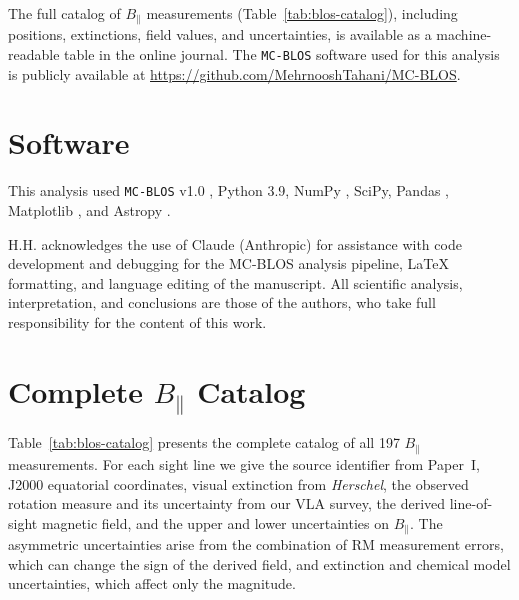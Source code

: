 \documentclass[twocolumn]{aastex701}
\begin{document}
The full catalog of $B_\parallel$ measurements
(Table~\ref{tab:blos-catalog}), including positions, extinctions, field
values, and uncertainties, is available as a machine-readable table in the
online journal. The \texttt{MC-BLOS} software used for this analysis is
publicly available at \url{https://github.com/MehrnooshTahani/MC-BLOS}.

\section{Software}

This analysis used \texttt{MC-BLOS} v1.0 \citep{tahani2025mcblos},
Python 3.9, NumPy \citep{harris2020array}, SciPy, Pandas
\citep{mckinney2010data},
Matplotlib \citep{hunter2007matplotlib}, and Astropy
\citep{astropy2022astropy}.

\begin{acknowledgments}
H.H. acknowledges the use of Claude (Anthropic) for assistance with code
development and debugging for the MC-BLOS analysis pipeline, \LaTeX{}
formatting, and language editing of the manuscript. All scientific analysis,
interpretation, and conclusions are those of the authors, who take full
responsibility for the content of this work.
\end{acknowledgments}




\appendix
\section{Complete $B_\parallel$ Catalog}
\label{app:catalog}

Table~\ref{tab:blos-catalog} presents the complete catalog of all 197
$B_\parallel$ measurements. For each sight line we give the source identifier
from Paper~I, J2000 equatorial coordinates, visual extinction from
\textit{Herschel}, the observed rotation measure and its uncertainty from our
VLA survey, the derived line-of-sight magnetic field, and the upper and lower
uncertainties on $B_\parallel$. The asymmetric uncertainties arise from the
combination of RM measurement errors, which can change the sign of the derived
field, and extinction and chemical model uncertainties, which affect only the
magnitude.



\end{document}
